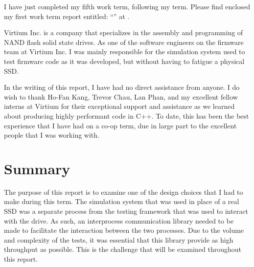 \documentclass[se]{uw-wkrpt}
\begin{document}
\begin{letter}
I have just completed my fifth work term, following my \theterm{} term.
Please find enclosed my first work term report entitled:
``\thetitle'' at \theemployer.  

Virtium Inc. is a company that specializes in the assembly and programming of
NAND flash solid state drives. As one of the software engineers on the 
firmware team at Virtium Inc. I was mainly responsible for the simulation 
system used to test firmware code as it was developed, but without having 
to fatigue a physical SSD.

In the writing of this report, I have had no direct assistance from anyone. 
I do wish to thank Ho-Fan Kang, Trevor Chau, Lan Phan, and my excellent fellow
interns at Virtium for their exceptional support and assistance as we learned
about producing highly performant code in C++. To date, this has been the best
experience that I have had on a co-op term, due in large part to the excellent
people that I was working with.

\end{letter}

\tableofcontents
\listoffigures

\section{Summary}

The purpose of this report is to examine one of the design choices that I
had to make during this term. The simulation system that was used in place
of a real SSD was a separate process from the testing framework that was
used to interact with the drive. As such, an interprocess communication
library needed to be made to facilitate the interaction between the two processes.
Due to the volume and complexity of the tests, it was essential that this
library provide as high throughput as possible. This is the challenge that will
be examined throughout this report.
\end{document}
